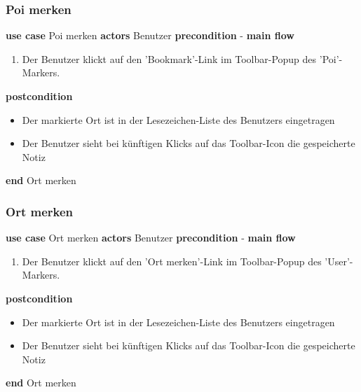 \subsubsection{Poi merken}\label{subsubsec:uc_poibookmark}
\noindent \textbf{use case} Poi merken \newline
\indent \textbf{actors} \newline
\indent \indent Benutzer \newline
\indent \textbf{precondition} \newline
\indent \indent - \newline
\indent \textbf{main flow}
\begin{enumerate}[labelwidth=0pt,leftmargin=39pt,noitemsep,topsep=0pt,parsep=0pt,partopsep=0pt]
\item Der Benutzer klickt auf den 'Bookmark'-Link im Toolbar-Popup des 'Poi'-Markers.
\end{enumerate}
\indent \indent \textbf{postcondition}
\begin{itemize}[label={},labelwidth=0pt,leftmargin=24pt,noitemsep,topsep=0pt,parsep=0pt,partopsep=0pt]
\item Der markierte Ort ist in der Lesezeichen-Liste des Benutzers eingetragen
\item Der Benutzer sieht bei künftigen Klicks auf das Toolbar-Icon die gespeicherte Notiz
\end{itemize}
\noindent \textbf{end} Ort merken \newline

\subsubsection{Ort merken}\label{subsubsec:uc_locnote}
\noindent \textbf{use case} Ort merken \newline
\indent \textbf{actors} \newline
\indent \indent Benutzer \newline
\indent \textbf{precondition} \newline
\indent \indent - \newline
\indent \textbf{main flow}
\begin{enumerate}[labelwidth=0pt,leftmargin=39pt,noitemsep,topsep=0pt,parsep=0pt,partopsep=0pt]
\item Der Benutzer klickt auf den 'Ort merken'-Link im Toolbar-Popup des 'User'-Markers.
\end{enumerate}
\indent \indent \textbf{postcondition}
\begin{itemize}[label={},labelwidth=0pt,leftmargin=24pt,noitemsep,topsep=0pt,parsep=0pt,partopsep=0pt]
\item Der markierte Ort ist in der Lesezeichen-Liste des Benutzers eingetragen
\item Der Benutzer sieht bei künftigen Klicks auf das Toolbar-Icon die gespeicherte Notiz
\end{itemize}
\noindent \textbf{end} Ort merken \newline

